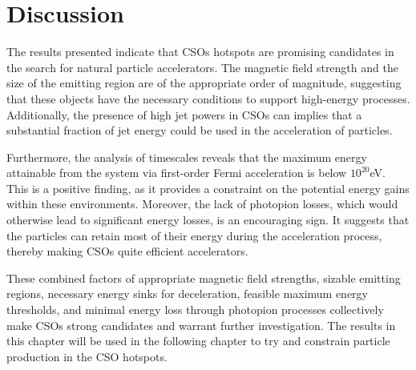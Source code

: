 \section{Discussion}
The results presented indicate that CSOs hotspots are promising candidates in the search for natural particle accelerators. The magnetic field strength and the size of the emitting region are of the appropriate order of magnitude, suggesting that these objects have the necessary conditions to support high-energy processes. Additionally, the presence of high jet powers in CSOs can implies that a substantial fraction of jet energy could be used in the acceleration of particles. 

Furthermore, the analysis of timescales reveals that the maximum energy attainable from the system via first-order Fermi acceleration is below $10^{20}$eV. This is a positive finding, as it provides a constraint on the potential energy gains within these environments. Moreover, the lack of photopion losses, which would otherwise lead to significant energy losses, is an encouraging sign. It suggests that the particles can retain most of their energy during the acceleration process, thereby making CSOs quite efficient accelerators.

These combined factors of appropriate magnetic field strengths, sizable emitting regions, necessary energy sinks for deceleration, feasible maximum energy thresholds, and minimal energy loss through photopion processes collectively make CSOs strong candidates and warrant further investigation. The results in this chapter will be used in the following chapter to try and constrain particle production in the CSO hotspots.